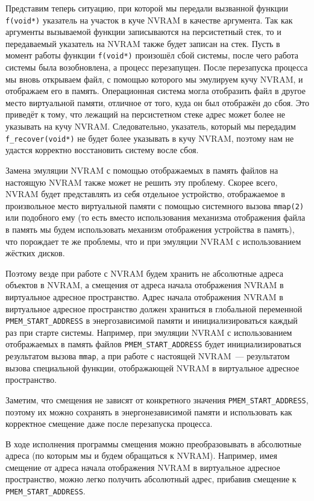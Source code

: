 \documentclass[times,specification,annotation]{itmo-student-thesis}
\begin{document}
Представим теперь ситуацию, при которой мы передали вызванной функции \texttt{f(void*)} указатель на участок в куче NVRAM в качестве аргумента. Так как аргументы вызываемой функции записываются на персистетный стек, то и передаваемый указатель на NVRAM также будет записан на стек. Пусть в момент работы функции \texttt{f(void*)} произошёл сбой системы, после чего работа системы была возобновлена, а процесс перезапущен. После перезапуска процесса мы вновь открываем файл, с помощью которого мы эмулируем кучу NVRAM, и отображаем его в память. Операционная система могла отобразить файл в другое место виртуальной памяти, отличное от того, куда он был отображён до сбоя. Это приведёт к тому, что лежащий на персистетном стеке адрес может более не указывать на кучу NVRAM. Следовательно, указатель, который мы передадим \texttt{f\_recover(void*)} не будет более указывать в кучу NVRAM, поэтому нам не удастся корректно восстановить систему восле сбоя.

Замена эмуляции NVRAM с помощью отображаемых в память файлов на настоящую NVRAM также может не решить эту проблему. Скорее всего, NVRAM будет представлять из себя отдельное устройство, отображаемое в произвольное место виртуальной памяти с помощью системного вызова \texttt{mmap(2)} или подобного ему (то есть вместо использования механизма отображения файла в память мы будем использовать механизм отображения устройства в память), что порождает те же проблемы, что и при эмуляции NVRAM с использованием жёстких дисков. 

Поэтому везде при работе с NVRAM будем хранить не абсолютные адреса объектов в NVRAM, а смещения от адреса начала отображения NVRAM в виртуальное адресное пространство. Адрес начала отображения NVRAM в виртуальное адресное пространство должен храниться в глобальной переменной \texttt{PMEM\_START\_ADDRESS} в энергозависимой памяти и инициализироваться каждый раз при старте системы. Например, при эмуляции NVRAM с использованием отображаемых в память файлов \texttt{PMEM\_START\_ADDRESS} будет инициализироваться результатом вызова \texttt{mmap}, а при работе с настоящей NVRAM~--- результатом вызова специальной функции, отображающей NVRAM в виртуальное адресное пространство.

Заметим, что смещения не зависят от конкретного значения \texttt{PMEM\_START\_ADDRESS}, поэтому их можно сохранять в энергонезависимой памяти и использовать как корректное смещение даже после перезапуска процесса.

В ходе исполнения программы смещения можно преобразовывать в абсолютные адреса (по которым мы и будем обращаться к NVRAM). Например, имея смещение от адреса начала отображения NVRAM в виртуальное адресное пространство, можно легко получить абсолютный адрес, прибавив смещение к \texttt{PMEM\_START\_ADDRESS}.
\end{document}
